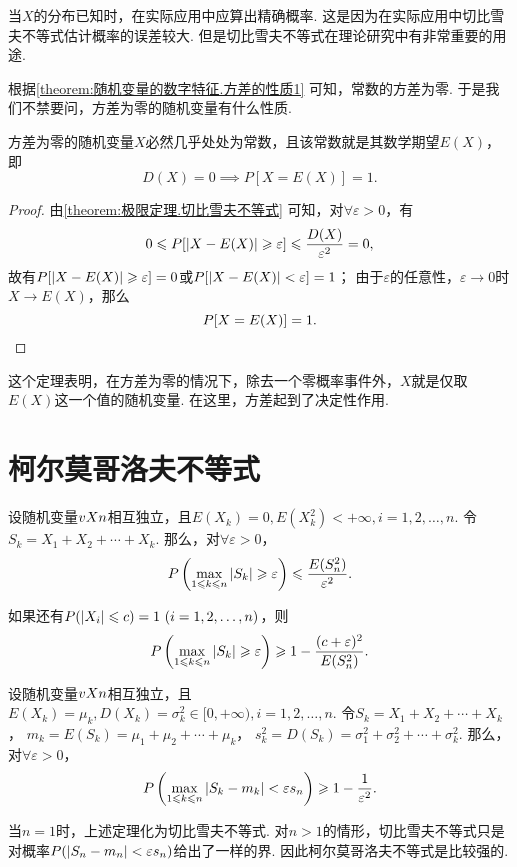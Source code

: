 当\(X\)的分布已知时，在实际应用中应算出精确概率.
这是因为在实际应用中切比雪夫不等式估计概率的误差较大.
但是切比雪夫不等式在理论研究中有非常重要的用途.

根据\cref{theorem:随机变量的数字特征.方差的性质1} 可知，常数的方差为零.
于是我们不禁要问，方差为零的随机变量有什么性质.
\begin{theorem}
方差为零的随机变量\(X\)必然几乎处处为常数，且该常数就是其数学期望\(E(X)\)，即\[
D(X)=0 \implies P[X=E(X)]=1.
\]
\begin{proof}
由\cref{theorem:极限定理.切比雪夫不等式} 可知，对\(\forall\varepsilon>0\)，有\[
0 \leqslant P[\abs{X-E(X)}\geqslant\varepsilon] \leqslant \frac{D(X)}{\varepsilon^2} = 0,
\]故有\(P[\abs{X-E(X)}\geqslant\varepsilon] = 0\)或\(P[\abs{X-E(X)}<\varepsilon] = 1\)；
由于\(\varepsilon\)的任意性，\(\varepsilon\to0\)时\(X \to E(X)\)，那么\[
P[X=E(X)]=1.
\qedhere
\]
\end{proof}
\end{theorem}
这个定理表明，在方差为零的情况下，除去一个零概率事件外，\(X\)就是仅取\(E(X)\)这一个值的随机变量.
在这里，方差起到了决定性作用.

\section{柯尔莫哥洛夫不等式}
\begin{theorem}
设随机变量\(v{X}{n}\)相互独立，且\(E(X_k) = 0, E(X_k^2) < +\infty, i=1,2,\dotsc,n\).
令\(S_k = X_1 + X_2 + \dotsb + X_k\).
那么，对\(\forall \varepsilon > 0\)，\[
P\left(
\max\limits_{1 \leqslant k \leqslant n} \abs{S_k} \geqslant \varepsilon
\right) \leqslant \frac{E(S_n^2)}{\varepsilon^2}.
\]

如果还有\(P(\abs{X_i} \leqslant c) = 1\ (i=1,2,\dotsc,n)\)，则\[
P\left(
\max\limits_{1 \leqslant k \leqslant n} \abs{S_k} \geqslant \varepsilon
\right) \geqslant 1 - \frac{(c+\varepsilon)^2}{E(S_n^2)}.
\]
\end{theorem}

\begin{theorem}
设随机变量\(v{X}{n}\)相互独立，且\(E(X_k) = \mu_k, D(X_k) = \sigma_k^2\in[0,+\infty), i=1,2,\dotsc,n\).
令\(S_k = X_1 + X_2 + \dotsb + X_k\)，%
\(m_k = E(S_k) = \mu_1 + \mu_2 + \dotsb + \mu_k\)，%
\(s_k^2 = D(S_k) = \sigma_1^2 + \sigma_2^2 + \dotsb + \sigma_k^2\).
那么，对\(\forall \varepsilon > 0\)，\[
P\left(
\max\limits_{1 \leqslant k \leqslant n} \abs{S_k - m_k} < \varepsilon s_n
\right) \geqslant 1 - \frac{1}{\varepsilon^2}.
\]
\end{theorem}
当\(n=1\)时，上述定理化为切比雪夫不等式.
对\(n>1\)的情形，切比雪夫不等式只是对概率\(P(\abs{S_n - m_n} < \varepsilon s_n)\)给出了一样的界.
因此柯尔莫哥洛夫不等式是比较强的.

